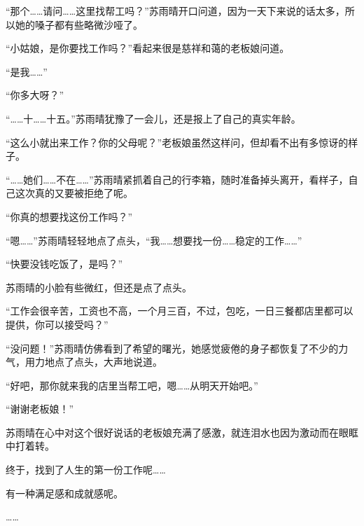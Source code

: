 “那个……请问……这里找帮工吗？”苏雨晴开口问道，因为一天下来说的话太多，所以她的嗓子都有些略微沙哑了。

“小姑娘，是你要找工作吗？”看起来很是慈祥和蔼的老板娘问道。

“是我……”

“你多大呀？”

“……十……十五。”苏雨晴犹豫了一会儿，还是报上了自己的真实年龄。

“这么小就出来工作？你的父母呢？”老板娘虽然这样问，但却看不出有多惊讶的样子。

“……她们……不在……”苏雨晴紧抓着自己的行李箱，随时准备掉头离开，看样子，自己这次真的又要被拒绝了呢。

“你真的想要找这份工作吗？”

“嗯……”苏雨晴轻轻地点了点头，“我……想要找一份……稳定的工作……”

“快要没钱吃饭了，是吗？”

苏雨晴的小脸有些微红，但还是点了点头。

“工作会很辛苦，工资也不高，一个月三百，不过，包吃，一日三餐都店里都可以提供，你可以接受吗？”

“没问题！”苏雨晴仿佛看到了希望的曙光，她感觉疲倦的身子都恢复了不少的力气，用力地点了点头，大声地说道。

“好吧，那你就来我的店里当帮工吧，嗯……从明天开始吧。”

“谢谢老板娘！”

苏雨晴在心中对这个很好说话的老板娘充满了感激，就连泪水也因为激动而在眼眶中打着转。

终于，找到了人生的第一份工作呢……

有一种满足感和成就感呢。

……
